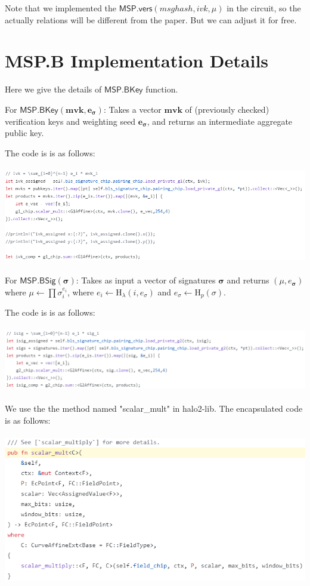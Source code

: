 \documentclass{article}
\begin{document}
Note that we implemented the $\mathsf{MSP.vers}(msghash,ivk, \mu)$ in the circuit, so the actually relations will be different from the paper. But we can adjust it for free.


\section{MSP.B Implementation Details}

Here we give the details of $\mathsf{MSP.BKey}$ function.


For $\mathsf{MSP.BKey}(\textbf{mvk}, \bm{e_\sigma})$: Takes a vector $\textbf{mvk}$ of (previously checked) verification keys and weighting seed $\bm{e_\sigma}$, and returns an intermediate aggregate public key.

The code is is as follows:
\\
\\
\includegraphics[width=0.9\linewidth]{msp_bkey_ivk_code.png}
\\
\\
For $\mathsf{MSP.BSig}(\bm{\sigma})$: Takes as input a vector of signatures $\bm{\sigma}$ and returns $(\mu,e_{\bm{\sigma}})$ where
$\mu \leftarrow \prod \sigma_i^{e_i}$, where $e_i \leftarrow \textrm{H}_{\lambda}(i,e_\sigma)$ and $e_\sigma \leftarrow \textrm{H}_{p}(\mathbb{\sigma})$.


The code is is as follows:
\\
\\
\includegraphics[width=0.9\linewidth]{msp_bkey_isig_code.png}
\\
\\

We use the the method named "scalar\_mult" in halo2-lib. The encapsulated code is as follows:
\\
\\
\includegraphics[width=0.9\linewidth]{scalar_mult_code.png}
\\
\\
\end{document}
